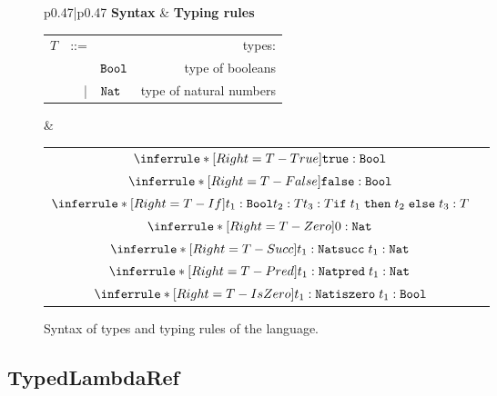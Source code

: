 \begin{figure}[h]
\footnotesize
\begin{tabular}{p{}|p{}}
    \textbf{Syntax} & \textbf{Typing rules} \tabularnewline[1em]
    \begin{tabular}{r@{\hspace{0.5em}}r@{\hspace{0.5em}}l@{\hspace{1.0em}}r}
        $T$ & ::= &         & types:                  \\
            &     & $\texttt{Bool}$ & type of booleans        \\
            & |   & $\texttt{Nat}$  & type of natural numbers \\
    \end{tabular}
&
    \renewcommand{\arraystretch}{2.5}
    \begin{tabular}{cr}
        $\inferrule*[Right=T-True]
            { }
            {\true : \Bool}$ & \\
        $\inferrule*[Right=T-False]
            { }
            {\false : \Bool}$ & \\
        $\inferrule*[Right=T-If]
            {t_1 : \Bool \\ t_2 : T \\ t_3 : T}
            {\ift{t_1}{t_2}{t_3} : T}$ & \\
        $\inferrule*[Right=T-Zero]
            { }
            {\zero : \Nat}$ & \\
        $\inferrule*[Right=T-Succ]
            {t_1 : \Nat}
            {\succt{t_1} : \Nat}$ & \\
        $\inferrule*[Right=T-Pred]
            {t_1 : \Nat}
            {\predt{t_1} : \Nat}$ & \\
        $\inferrule*[Right=T-IsZero]
            {t_1 : \Nat}
            {\iszerot{t_1} : \Bool}$ & 
    \end{tabular}
\end{tabular}
\caption{Syntax of types and typing rules of the  language.}
\label{fig:language-definition-typedarith-types}
\end{figure}



\subsection{TypedLambdaRef}
\label{sec:language-definition-typedlambdaref}

